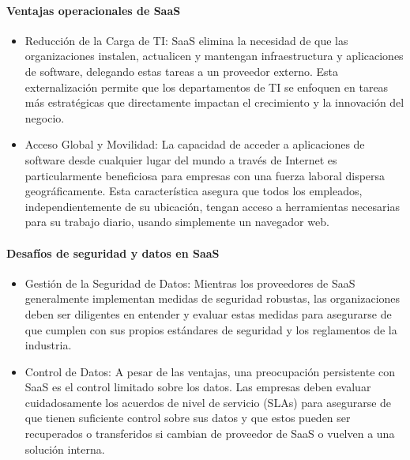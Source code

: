 {                \paragraph{Ventajas operacionales de SaaS}
                    \begin{itemize}
                        \item Reducci{\'o}n de la Carga de TI: SaaS elimina la necesidad de que las organizaciones instalen, actualicen y mantengan infraestructura y aplicaciones de software, delegando estas tareas a un proveedor externo. Esta externalizaci{\'o}n permite que los departamentos de TI se enfoquen en tareas m{\'a}s estrat{\'e}gicas que directamente impactan el crecimiento y la innovaci{\'o}n del negocio.
                        \item Acceso Global y Movilidad: La capacidad de acceder a aplicaciones de software desde cualquier lugar del mundo a trav{\'e}s de Internet es particularmente beneficiosa para empresas con una fuerza laboral dispersa geogr{\'a}ficamente. Esta caracter{\'i}stica asegura que todos los empleados, independientemente de su ubicaci{\'o}n, tengan acceso a herramientas necesarias para su trabajo diario, usando simplemente un navegador web.
                    \end{itemize}
                \paragraph{Desaf{\'i}os de seguridad y datos en SaaS}
                    \begin{itemize}
                        \item Gesti{\'o}n de la Seguridad de Datos: Mientras los proveedores de SaaS generalmente implementan medidas de seguridad robustas, las organizaciones deben ser diligentes en entender y evaluar estas medidas para asegurarse de que cumplen con sus propios est{\'a}ndares de seguridad y los reglamentos de la industria.
                        \item Control de Datos: A pesar de las ventajas, una preocupaci{\'o}n persistente con SaaS es el control limitado sobre los datos. Las empresas deben evaluar cuidadosamente los acuerdos de nivel de servicio (SLAs) para asegurarse de que tienen suficiente control sobre sus datos y que estos pueden ser recuperados o transferidos si cambian de proveedor de SaaS o vuelven a una soluci{\'o}n interna.
                    \end{itemize}
}
